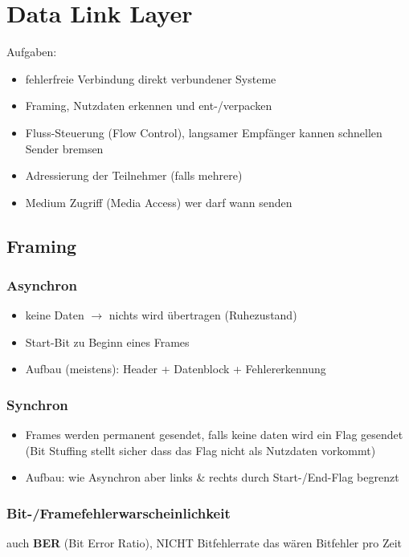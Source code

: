 \section{Data Link Layer}

Aufgaben:
\begin{itemize}
	\item fehlerfreie Verbindung direkt verbundener Systeme
	\item Framing, Nutzdaten erkennen und ent-/verpacken
	\item Fluss-Steuerung (Flow Control), langsamer Empfänger kannen schnellen
	      Sender bremsen
	\item Adressierung der Teilnehmer (falls mehrere)
	\item Medium Zugriff (Media Access) wer darf wann senden
\end{itemize}

\subsection{Framing}

\subsubsection{Asynchron}
\begin{itemize}
	\item keine Daten $\rightarrow$ nichts wird übertragen (Ruhezustand)
	\item Start-Bit zu Beginn eines Frames
	\item Aufbau (meistens): Header + Datenblock + Fehlererkennung
\end{itemize}


\subsubsection{Synchron}
\begin{itemize}
	\item Frames werden permanent gesendet, falls keine daten wird ein Flag gesendet
	      (Bit Stuffing stellt sicher dass das Flag nicht als Nutzdaten vorkommt)
	\item Aufbau: wie Asynchron aber links \& rechts durch Start-/End-Flag begrenzt
\end{itemize}


\subsubsection{Bit-/Framefehlerwarscheinlichkeit}
\small{auch \textbf{BER} (Bit Error Ratio), NICHT Bitfehlerrate das wären Bitfehler pro Zeit}

